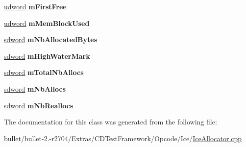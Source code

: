 \begin{DoxyCompactItemize}
\item 
\hypertarget{class_default_allocator_ab00c077147968e66294103d252fa2f7f}{\hyperlink{_ice_types_8h_a44c6f1920ba5551225fb534f9d1a1733}{udword} {\bfseries m\+First\+Free}}\label{class_default_allocator_ab00c077147968e66294103d252fa2f7f}

\item 
\hypertarget{class_default_allocator_a84596ab4d3c51b7a41bbfa140a2661e8}{\hyperlink{_ice_types_8h_a44c6f1920ba5551225fb534f9d1a1733}{udword} {\bfseries m\+Mem\+Block\+Used}}\label{class_default_allocator_a84596ab4d3c51b7a41bbfa140a2661e8}

\item 
\hypertarget{class_default_allocator_abd4db8ed8a3db6d5dffe45aefcf4b9d7}{\hyperlink{_ice_types_8h_a1459338e4e102e56fead3b10918f15dd}{sdword} {\bfseries m\+Nb\+Allocated\+Bytes}}\label{class_default_allocator_abd4db8ed8a3db6d5dffe45aefcf4b9d7}

\item 
\hypertarget{class_default_allocator_a190262496dfa81db6ac90a62ad7eccbe}{\hyperlink{_ice_types_8h_a1459338e4e102e56fead3b10918f15dd}{sdword} {\bfseries m\+High\+Water\+Mark}}\label{class_default_allocator_a190262496dfa81db6ac90a62ad7eccbe}

\item 
\hypertarget{class_default_allocator_a68e306f0c0f0f9b1caa3c0de728c12fa}{\hyperlink{_ice_types_8h_a1459338e4e102e56fead3b10918f15dd}{sdword} {\bfseries m\+Total\+Nb\+Allocs}}\label{class_default_allocator_a68e306f0c0f0f9b1caa3c0de728c12fa}

\item 
\hypertarget{class_default_allocator_ae220df78de79983dbc2d1fa820dd7e6d}{\hyperlink{_ice_types_8h_a1459338e4e102e56fead3b10918f15dd}{sdword} {\bfseries m\+Nb\+Allocs}}\label{class_default_allocator_ae220df78de79983dbc2d1fa820dd7e6d}

\item 
\hypertarget{class_default_allocator_a0298719d774c81dd843502b35eb2c4b9}{\hyperlink{_ice_types_8h_a1459338e4e102e56fead3b10918f15dd}{sdword} {\bfseries m\+Nb\+Reallocs}}\label{class_default_allocator_a0298719d774c81dd843502b35eb2c4b9}

\end{DoxyCompactItemize}


The documentation for this class was generated from the following file\+:\begin{DoxyCompactItemize}
\item 
bullet/bullet-\/2.-\/r2704/\+Extras/\+C\+D\+Test\+Framework/\+Opcode/\+Ice/\hyperlink{_ice_allocator_8cpp}{Ice\+Allocator.\+cpp}\end{DoxyCompactItemize}
